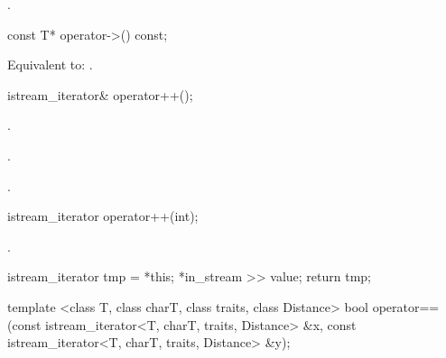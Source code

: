 \begin{itemdescr}
\pnum
\returns
{}.
\end{itemdescr}

%
%
\begin{itemdecl}
const T* operator->() const;
\end{itemdecl}

\begin{itemdescr}
\pnum
\effects Equivalent to:
.
\end{itemdescr}

%
%
\begin{itemdecl}
istream_iterator& operator++();
\end{itemdecl}

\begin{itemdescr}
\pnum
\requires {}.

\pnum
\effects
{}.

\pnum
\returns
{}.
\end{itemdescr}

%
%
\begin{itemdecl}
istream_iterator operator++(int);
\end{itemdecl}

\begin{itemdescr}
\pnum
\requires {}.

\pnum
\effects
\begin{codeblock}
istream_iterator tmp = *this;
*in_stream >> value;
return tmp;
\end{codeblock}
\end{itemdescr}

%
%
\begin{itemdecl}
template <class T, class charT, class traits, class Distance>
  bool operator==(const istream_iterator<T, charT, traits, Distance> &x,
                  const istream_iterator<T, charT, traits, Distance> &y);
\end{itemdecl}

